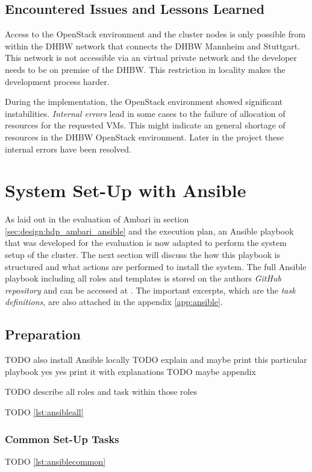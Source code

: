 \subsection{Encountered Issues and Lessons Learned}

Access to the OpenStack environment and the cluster nodes is only possible from within the \ac{DHBW} network that connects the \ac{DHBW} Mannheim and Stuttgart.
This network is not accessible via an virtual private network and the developer needs to be on premise of the \ac{DHBW}. This restriction in locality makes the development process harder.

During the implementation, the OpenStack environment showed significant instabilities.
\emph{Internal errors} lead in some cases to the failure of allocation of resources for the requested \acp{VM}.
This might indicate an general shortage of resources in the \ac{DHBW} OpenStack environment. Later in the project these internal errors have been resolved.

\section{System Set-Up with Ansible}

As laid out in the evaluation of Ambari in section \vref{sec:design:hdp_ambari_ansible} 
and the execution plan, 
an Ansible playbook that was developed for the evaluation is now adapted to perform the system setup of the cluster. 
The next section will discuss the how this playbook is structured and what actions are performed to install the system.
The full Ansible playbook including all roles and templates is stored on the authors \emph{GitHub repository} and can be accessed at 
.
The important excerpts, which are the \emph{task definitions}, are also attached in the appendix \vref{app:ansible}.

\subsection{Preparation}

TODO also install Ansible locally
TODO explain and maybe print this particular playbook yes yes print it with explanations
TODO maybe appendix

TODO describe all roles and task within those roles

TODO \vref{lst:ansibleall}

\subsubsection{Common Set-Up Tasks}
TODO \vref{lst:ansiblecommon}


